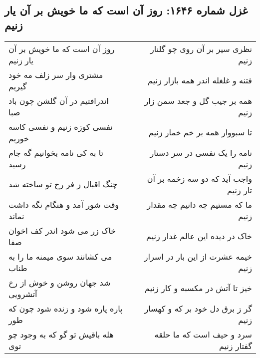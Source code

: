 \begin{center}
\section*{غزل شماره ۱۶۴۶: روز آن است که ما خویش بر آن یار زنیم}
\label{sec:1646}
\begin{longtable}{l p{0.5cm} r}
روز آن است که ما خویش بر آن یار زنیم
&&
نظری سیر بر آن روی چو گلنار زنیم
\\
مشتری وار سر زلف مه خود گیریم
&&
فتنه و غلغله اندر همه بازار زنیم
\\
اندرافتیم در آن گلشن چون باد صبا
&&
همه بر جیب گل و جعد سمن زار زنیم
\\
نفسی کوزه زنیم و نفسی کاسه خوریم
&&
تا سبووار همه بر خم خمار زنیم
\\
تا به کی نامه بخوانیم گه جام رسید
&&
نامه را یک نفسی در سر دستار زنیم
\\
چنگ اقبال ز فر رخ تو ساخته شد
&&
واجب آید که دو سه زخمه بر آن تار زنیم
\\
وقت شور آمد و هنگام نگه داشت نماند
&&
ما که مستیم چه دانیم چه مقدار زنیم
\\
خاک زر می شود اندر کف اخوان صفا
&&
خاک در دیده این عالم غدار زنیم
\\
می کشانند سوی میمنه ما را به طناب
&&
خیمه عشرت از این بار در اسرار زنیم
\\
شد جهان روشن و خوش از رخ آتشرویی
&&
خیز تا آتش در مکسبه و کار زنیم
\\
پاره پاره شود و زنده شود چون که طور
&&
گر ز برق دل خود بر که و کهسار زنیم
\\
هله باقیش تو گو که به وجود چو توی
&&
سرد و حیف است که ما حلقه گفتار زنیم
\\
\end{longtable}
\end{center}
